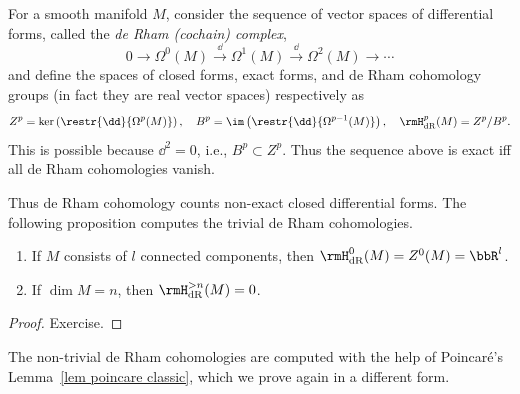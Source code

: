\begin{defn}
    For a smooth manifold $M$, consider the sequence of vector spaces of differential forms, called the \emph{de Rham (cochain) complex},
    \[0\to\Omega^0(M)\overset\dd\to\Omega^1(M)\overset\dd\to\Omega^2(M)\to\cdots\]
    and define the spaces of closed forms, exact forms, and de Rham cohomology groups (in fact they are real vector spaces) respectively as
    \[Z^p=\ker\left(\restr{\dd}{\Omega^p(M)}\right),\quad B^p=\im\left(\restr{\dd}{\Omega^{p-1}(M)}\right),\quad \rmH_{\rm dR}^p(M)=Z^p/B^p.\]
    This is possible because $\dd^2=0$, i.e., $B^p\subset Z^p$.
    Thus the sequence above is exact iff all de Rham cohomologies vanish.
\end{defn}
Thus de Rham cohomology counts non-exact closed differential forms. The following proposition computes the trivial de Rham cohomologies.

\begin{prop}\label{prop zeroth cohomology}
    \begin{enumerate}
    \item If $M$ consists of $l$ connected components, then $\rmH_{\rm dR}^0(M)=Z^0(M)=\bbR^l$.
    \item If $\dim M=n$, then $\rmH_{\rm dR}^{> n}(M)=0$.
\end{enumerate}
\end{prop}
\begin{proof}
    Exercise.
\end{proof}

The non-trivial de Rham cohomologies are computed with the help of Poincar\'e's Lemma~\ref{lem poincare classic}, which we prove again in a different form.


